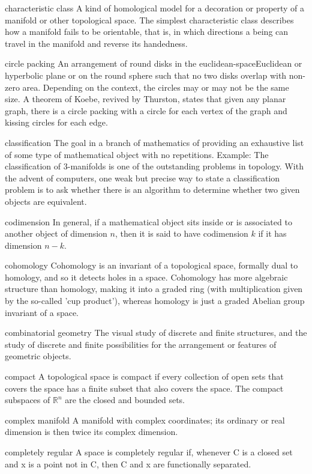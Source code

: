 \begin{description}
\begin{tiny}
\item[characteristic class] A kind of homological model for a decoration or property of a manifold or other topological space. The simplest characteristic class describes how a manifold fails to be orientable, that is, in which directions a being can travel in the manifold and reverse its handedness.
\item[circle packing] An arrangement of round disks in the euclidean-space{Euclidean} or hyperbolic plane or on the round sphere such that no two disks overlap with non-zero area. Depending on the context, the circles may or may not be the same size. A theorem of Koebe, revived by Thurston, states that given any planar graph, there is a circle packing with a circle for each vertex of the graph and kissing circles for each edge.
\item[classification] The goal in a branch of mathematics of providing an exhaustive list of some type of mathematical object with no repetitions. Example: The classification of 3-manifolds is one of the outstanding problems in topology. With the advent of computers, one weak but precise way to state a classification problem is to ask whether there is an algorithm to determine whether two given objects are equivalent.
\item[codimension] In general, if a mathematical object sits inside or is associated to another object of dimension $n$, then it is said to have codimension $k$ if it has dimension $n-k$.
\item[cohomology] Cohomology is an invariant of a topological space, formally dual to homology, and so it detects holes in a space. Cohomology has more algebraic structure than homology, making it into a graded ring (with multiplication given by the so-called 'cup product'), whereas homology is just a graded Abelian group invariant of a space. 
\item[combinatorial geometry] The visual study of discrete and finite structures, and the study of discrete and finite possibilities for the arrangement or features of geometric objects.
\item[compact] A topological space is compact if every collection of open sets that covers the space has a finite subset that also covers the space. The compact subspaces of $\mathbb{R}^{n}$ are the closed and bounded sets.
\item[complex manifold] A manifold with complex coordinates; its ordinary or real dimension is then twice its complex dimension.
\item[completely regular] A space is completely regular if, whenever C is a closed set and x is a point not in C, then C and {x} are functionally separated.

\end{tiny}
\end{description}
